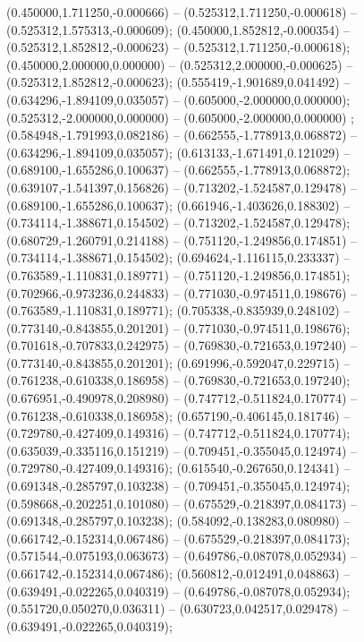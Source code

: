  (0.450000,1.711250,-0.000666) -- (0.525312,1.711250,-0.000618) -- (0.525312,1.575313,-0.000609);
 (0.450000,1.852812,-0.000354) -- (0.525312,1.852812,-0.000623) -- (0.525312,1.711250,-0.000618);
 (0.450000,2.000000,0.000000) -- (0.525312,2.000000,-0.000625) -- (0.525312,1.852812,-0.000623);
 (0.555419,-1.901689,0.041492) -- (0.634296,-1.894109,0.035057) -- (0.605000,-2.000000,0.000000);
 (0.525312,-2.000000,0.000000) -- (0.605000,-2.000000,0.000000) ;
 (0.584948,-1.791993,0.082186) -- (0.662555,-1.778913,0.068872) -- (0.634296,-1.894109,0.035057);
 (0.613133,-1.671491,0.121029) -- (0.689100,-1.655286,0.100637) -- (0.662555,-1.778913,0.068872);
 (0.639107,-1.541397,0.156826) -- (0.713202,-1.524587,0.129478) -- (0.689100,-1.655286,0.100637);
 (0.661946,-1.403626,0.188302) -- (0.734114,-1.388671,0.154502) -- (0.713202,-1.524587,0.129478);
 (0.680729,-1.260791,0.214188) -- (0.751120,-1.249856,0.174851) -- (0.734114,-1.388671,0.154502);
 (0.694624,-1.116115,0.233337) -- (0.763589,-1.110831,0.189771) -- (0.751120,-1.249856,0.174851);
 (0.702966,-0.973236,0.244833) -- (0.771030,-0.974511,0.198676) -- (0.763589,-1.110831,0.189771);
 (0.705338,-0.835939,0.248102) -- (0.773140,-0.843855,0.201201) -- (0.771030,-0.974511,0.198676);
 (0.701618,-0.707833,0.242975) -- (0.769830,-0.721653,0.197240) -- (0.773140,-0.843855,0.201201);
 (0.691996,-0.592047,0.229715) -- (0.761238,-0.610338,0.186958) -- (0.769830,-0.721653,0.197240);
 (0.676951,-0.490978,0.208980) -- (0.747712,-0.511824,0.170774) -- (0.761238,-0.610338,0.186958);
 (0.657190,-0.406145,0.181746) -- (0.729780,-0.427409,0.149316) -- (0.747712,-0.511824,0.170774);
 (0.635039,-0.335116,0.151219) -- (0.709451,-0.355045,0.124974) -- (0.729780,-0.427409,0.149316);
 (0.615540,-0.267650,0.124341) -- (0.691348,-0.285797,0.103238) -- (0.709451,-0.355045,0.124974);
 (0.598668,-0.202251,0.101080) -- (0.675529,-0.218397,0.084173) -- (0.691348,-0.285797,0.103238);
 (0.584092,-0.138283,0.080980) -- (0.661742,-0.152314,0.067486) -- (0.675529,-0.218397,0.084173);
 (0.571544,-0.075193,0.063673) -- (0.649786,-0.087078,0.052934) -- (0.661742,-0.152314,0.067486);
 (0.560812,-0.012491,0.048863) -- (0.639491,-0.022265,0.040319) -- (0.649786,-0.087078,0.052934);
 (0.551720,0.050270,0.036311) -- (0.630723,0.042517,0.029478) -- (0.639491,-0.022265,0.040319);
